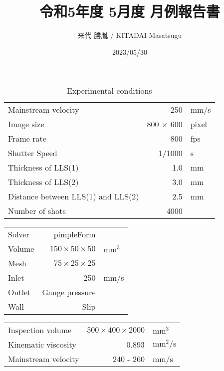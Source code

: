 \documentclass[a4j]{jsarticle}
\author{来代 勝胤 / KITADAI Masatsugu}
\title{令和5年度 5月度 月例報告書}
\date{2023/05/30}
\begin{document}
\columnseprule=0.1mm
\maketitle

\begin{table}[h]
  \label{table:data_type}
  \centering
  \caption{Experimental conditions}
  \begin{tabular}{l r l}
    \hline
    Mainstream velocity                & 250              & mm/s  \\
    Image size                         & 800 $\times$ 600 & pixel \\
    Frame rate                         & 800              & fps   \\
    Shutter Speed                      & 1/1000           & s     \\
    Thickness of LLS(1)                & 1.0              & mm    \\
    Thickness of LLS(2)                & 3.0              & mm    \\
    Distance between LLS(1) and LLS(2) & 2.5              & mm    \\
    Number of shots                    & 4000             &       \\ \hline
  \end{tabular}
\end{table}

\begin{table}[h]
  \label{table:data_type}
  \centering
  \begin{tabular}{l r l}
    \hline
    Solver & pimpleForm                &                 \\
    Volume & $150 \times 50 \times 50$ & $\mathrm{mm}^3$ \\
    Mesh   & $75 \times 25 \times 25$  &                 \\
    Inlet  & 250                       & mm/s            \\
    Outlet & Gauge pressure            &                 \\
    Wall   & Slip                      &                 \\\hline
  \end{tabular}
\end{table}

\begin{table}[h]
  \label{table:data_type}
  \centering
  \begin{tabular}{l r l}
    \hline
    Inspection volume   & $500 \times 400 \times 2000$ & $\mathrm{mm}^3$              \\
    Kinematic viscosity & 0.893                        & $\mathrm{mm}^2 / \mathrm{s}$ \\
    Mainstream velocity & 240 - 260                    & mm/s                         \\ \hline
  \end{tabular}
\end{table}
\end{document}
